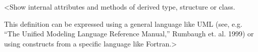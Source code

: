 %


<Show internal attributes and methods of derived type, structure or class.

 This definition can be expressed using a general language like UML 
 (see, e.g. ``The Unified Modeling Language Reference Manual,'' 
 Rumbaugh et. al. 1999) or using constructs from a specific language like 
 Fortran.>

